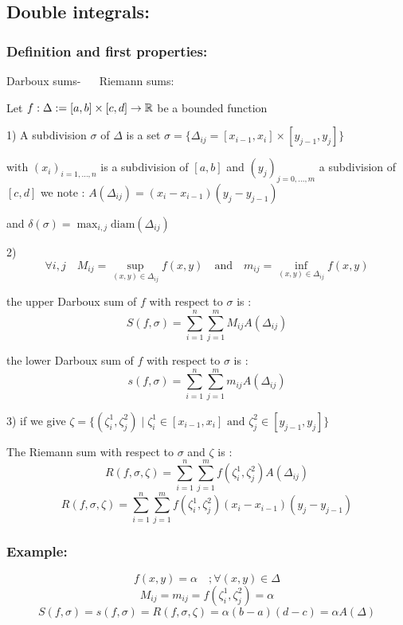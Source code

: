 \subsection{Double integrals:}
\subsubsection{Definition and first properties:}

\begin{definition}
  Darboux sums- $\quad $ Riemann sums:

  Let $f: \Delta := \left[a,b\right]\times\left[c,d\right] \to \mathbb{R} $  be a bounded function

  1) A subdivision $\sigma$ of $\Delta$ is a set $\sigma = \{\Delta_{ij} = \left[x_{i-1}, x_i\right]\times\left[y_{j-1}, y_j\right] \}$

  with  $(x_i)_{i = 1,\dots,n}$ is a subdivision of $\left[a,b\right]$ and $(y_j)_{j = 0,\dots,m}$ a subdivision of 
  $\left[c,d\right]$ we note : $A(\Delta_{ij}) = (x_i - x_{i-1})(y_j -y_{j-1})$

  and $\delta(\sigma) = \max_{i,j} \text{diam}(\Delta_{ij})$

  2) 
  \[\forall i,j \quad M_{ij} = \sup_{(x,y)\in\Delta_{ij}}f(x,y) \quad \text{and} \quad m_{ij} = \inf_{(x,y)\in\Delta_{ij}}f(x,y)\]

  the upper Darboux sum of $f$ with respect to $\sigma$ is :
  \[S(f,\sigma) = \sum_{i=1}^n\sum_{j=1}^m M_{ij}A(\Delta_{ij})\]

  the lower Darboux sum of $f$ with respect to $\sigma$ is :
  \[s(f,\sigma) = \sum_{i=1}^n\sum_{j=1}^m m_{ij}A(\Delta_{ij})\]

  3) if we give $\zeta = \{(\zeta_i^1,\zeta_j^2) \mid \zeta_i^1 \in \left[x_{i-1},x_i\right] \text{ and }\zeta_j^2 \in \left[y_{j-1},y_j\right]\}$

  The Riemann sum with respect to $\sigma$ and $\zeta$ is :
  \[R(f,\sigma,\zeta)= \sum_{i=1}^n\sum_{j=1}^m f(\zeta_i^1,\zeta_j^2)A(\Delta_{ij})\]
  \[R(f,\sigma,\zeta)= \sum_{i=1}^n\sum_{j=1}^m f(\zeta_i^1,\zeta_j^2)(x_i - x_{i-1})(y_j - y_{j-1})\]

\end{definition}

\subsubsection{Example:}

\[ f(x,y) = \alpha \quad; \forall(x,y) \in \Delta\]
\[M_{ij} = m_{ij} = f(\zeta_i^1, \zeta_j^2) = \alpha\]
\[S(f,\sigma) = s(f, \sigma) = R(f,\sigma, \zeta) = \alpha(b-a)(d-c) = \alpha A(\Delta)\]

